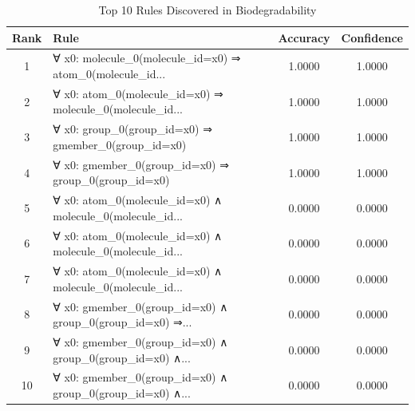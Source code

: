 \documentclass[11pt,a4paper]{article}
\begin{document}
\begin{table}[h!]
\centering
\small
\caption{Top 10 Rules Discovered in Biodegradability}
\label{tab:rules_Biodegradability}
\begin{tabular}{|c|p{5cm}|c|c|}
\hline
\textbf{Rank} & \textbf{Rule} & \textbf{Accuracy} & \textbf{Confidence} \\
\hline
1 & ∀ x0: molecule\_0(molecule\_id=x0) ⇒ atom\_0(molecule\_id... & 1.0000 & 1.0000 \\
2 & ∀ x0: atom\_0(molecule\_id=x0) ⇒ molecule\_0(molecule\_id... & 1.0000 & 1.0000 \\
3 & ∀ x0: group\_0(group\_id=x0) ⇒ gmember\_0(group\_id=x0) & 1.0000 & 1.0000 \\
4 & ∀ x0: gmember\_0(group\_id=x0) ⇒ group\_0(group\_id=x0) & 1.0000 & 1.0000 \\
5 & ∀ x0: atom\_0(molecule\_id=x0) ∧ molecule\_0(molecule\_id... & 0.0000 & 0.0000 \\
6 & ∀ x0: atom\_0(molecule\_id=x0) ∧ molecule\_0(molecule\_id... & 0.0000 & 0.0000 \\
7 & ∀ x0: atom\_0(molecule\_id=x0) ∧ molecule\_0(molecule\_id... & 0.0000 & 0.0000 \\
8 & ∀ x0: gmember\_0(group\_id=x0) ∧ group\_0(group\_id=x0) ⇒... & 0.0000 & 0.0000 \\
9 & ∀ x0: gmember\_0(group\_id=x0) ∧ group\_0(group\_id=x0) ∧... & 0.0000 & 0.0000 \\
10 & ∀ x0: gmember\_0(group\_id=x0) ∧ group\_0(group\_id=x0) ∧... & 0.0000 & 0.0000 \\
\hline
\end{tabular}
\end{table}
\end{document}
